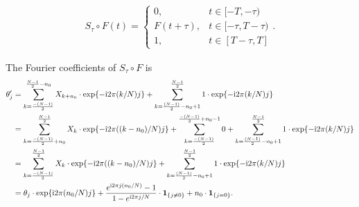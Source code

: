 \begin{align}\label{eq:def of shifted curve}
	S_\tau\circ F(t)=
	\begin{cases}
	0, &t\in[-T,-\tau)\\
	F(t+ \tau), &t\in[-\tau,T-\tau)\\
	1,& t\in [T-\tau,T]
	\end{cases}.
\end{align}

The Fourier coefficients of $S_\tau \circ F$ is
\begin{align*}
	\theta_j' 
	&= \sum_{k=\frac{-(N-1)}{2}}^{\frac{N-1}{2}-n_0} X_{k+n_0} \cdot \exp\{-\complexunit{}2\pi ({k}/{N})j\} + 
	\sum_{k=\frac{(N-1)}{2}-n_0+1}^{\frac{N-1}{2}} 1 \cdot \exp\{-\complexunit{}2\pi ({k}/{N})j\} \\
	&= \sum_{k=\frac{-(N-1)}{2}+n_0}^{\frac{N-1}{2}} X_{k} 
	\cdot \exp\{-\complexunit{}2\pi ({(k-n_0)}/{N})j\} 
	+ \sum_{k=\frac{-(N-1)}{2}}^{\frac{-(N-1)}{2}+n_0-1} 0 
	+ \sum_{k=\frac{(N-1)}{2}-n_0+1}^{\frac{N-1}{2}} 1 \cdot \exp\{-\complexunit{}2\pi ({k}/{N})j\}
	\\
	&= \sum_{k=\frac{-(N-1)}{2}}^{\frac{N-1}{2}} X_{k} \cdot 
	\exp\{-\complexunit{}2\pi ({(k-n_0)}/{N})j\} 
	+ \sum_{k=\frac{(N-1)}{2}-n_0+1}^{\frac{N-1}{2}} 1 \cdot \exp\{-\complexunit{}2\pi ({k}/{N})j\}
	\\
	&= \theta_j \cdot \exp \{ \complexunit{}2\pi (n_0/N)j \} + \frac{e^{\complexunit{}2\pi j (n_0/N)}-1}{1-e^{\complexunit{}2\pi j /N}} \cdot \mathbf{1}_{\left\{ j\neq0 \right\}} + n_0 \cdot \mathbf{1}_{\left\{ j=0 \right\}}
	.
\end{align*}

